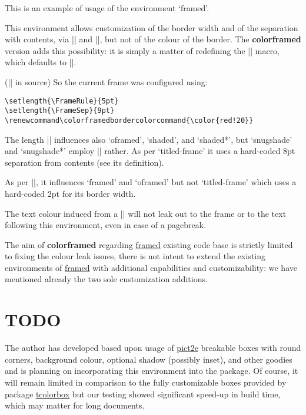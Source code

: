 \documentclass[a4paper,dvipdfmx,11pt,english]{article}
\def\colorframedbordercolorcommand{\color{red!20}}
\def\ctanpackage#1{\href{https://ctan.org/pkg/#1}{#1}}
\newcommand\colorframed{%
        \texorpdfstring{{\color{joli}\bfseries colorframed}}{colorframed}\xspace}
\begin{document}
\begin{framed}
  This is an example of usage of the environment `framed'.

  This environment allows customization of the border width
  and of the separation with contents, via |\FrameRule| and
  |\FrameSep|, but not of the colour of the border.  The
  \colorframed version adds this possibility: it is simply a
  matter of redefining the |\colorframedbordercolorcommand|
  macro, which defaults to |\normalcolor|.

\footnotesize (|\color{blue}| in source)
\normalsize
\color{blue}
  So the current frame was configured using:
\begin{verbatim}
\setlength{\FrameRule}{5pt}
\setlength{\FrameSep}{9pt}
\renewcommand\colorframedbordercolorcommand{\color{red!20}}
\end{verbatim}
\begin{footnotesize}\normalcolor
  The length |\FrameSep| influences also `oframed', `shaded', and `shaded*',
  but `snugshade' and `snugshade*' employ |\fboxsep| rather.  As per `titled-frame'
  it uses a hard-coded 8pt separation from contents (see its definition).

  As per |\FrameRule|, it influences `framed' and `oframed' but not
  `titled-frame' which uses a hard-coded 2pt for its border width.\par
\end{footnotesize}
  The text colour induced from a |\color{blue}|
  will not leak out to the frame or to the text following this
  environment, even in case of a pagebreak.
\end{framed}

The aim of \colorframed regarding \ctanpackage{framed} existing
code base is strictly limited to fixing the colour leak issues,
there is not intent to extend the existing environments of
\ctanpackage{framed} with additional capabilities and
customizability: we have mentioned already the two sole
customization additions.

\section{TODO}

The author has developed based upon usage of \ctanpackage{pict2e}
breakable boxes with round corners, background colour, optional
shadow (possibly inset), and other goodies and is planning on
incorporating this environment into the package.
%
Of course, it will remain limited in comparison to the fully
customizable boxes provided by package \ctanpackage{tcolorbox}
but our testing showed significant speed-up in build time, which
may matter for long documents.
\end{document}
